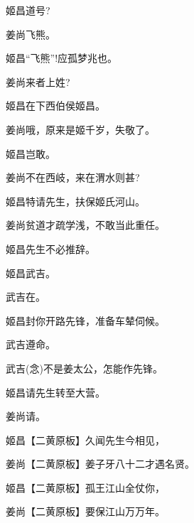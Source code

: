 {姬昌\hspace{30pt}道号?

姜尚\hspace{30pt}飞熊。

姬昌\hspace{30pt}``飞熊''!应孤梦兆也。

姜尚\hspace{30pt}来者上姓?

姬昌\hspace{30pt}在下西伯侯姬昌。

姜尚\hspace{30pt}哦，原来是姬千岁，失敬了。

姬昌\hspace{30pt}岂敢。

姜尚\hspace{30pt}不在西岐，来在渭水则甚?

姬昌\hspace{30pt}特请先生，扶保姬氏河山。

姜尚\hspace{30pt}贫道才疏学浅，不敢当此重任。

姬昌\hspace{30pt}先生不必推辞。

姬昌\hspace{30pt}武吉。

武吉\hspace{30pt}在。

姬昌\hspace{30pt}封你开路先锋，准备车辇伺候。

武吉\hspace{30pt}遵命。

武吉\hspace{30pt}({\akai 念})不是姜太公，怎能作先锋。

姬昌\hspace{30pt}请先生转至大营。

姜尚\hspace{30pt}请。

姬昌\hspace{30pt}【{\akai 二黄原板}】久闻先生今相见，

姜尚\hspace{30pt}【{\akai 二黄原板}】姜子牙八十二才遇名贤。

姬昌\hspace{30pt}【{\akai 二黄原板}】孤王江山全仗你，

姜尚\hspace{30pt}【{\akai 二黄原板}】要保江山万万年。

}
